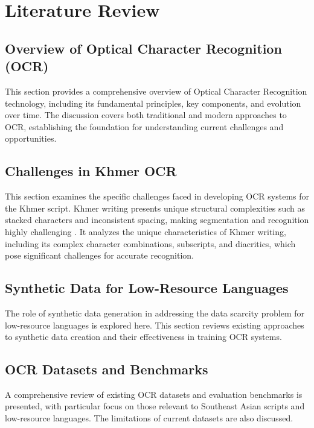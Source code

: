 \chapter{Literature Review}
\label{ch:literature}

\section{Overview of Optical Character Recognition (OCR)}
\label{sec:ocr-overview}
This section provides a comprehensive overview of Optical Character Recognition technology, including its fundamental principles, key components, and evolution over time. The discussion covers both traditional and modern approaches to OCR, establishing the foundation for understanding current challenges and opportunities.

\section{Challenges in Khmer OCR}
\label{sec:khmer-challenges}
This section examines the specific challenges faced in developing OCR systems for the Khmer script. Khmer writing presents unique structural complexities such as stacked characters and inconsistent spacing, making segmentation and recognition highly challenging \cite{muaz2015khmerocr}. It analyzes the unique characteristics of Khmer writing, including its complex character combinations, subscripts, and diacritics, which pose significant challenges for accurate recognition.

\section{Synthetic Data for Low-Resource Languages}
\label{sec:synthetic-data}
The role of synthetic data generation in addressing the data scarcity problem for low-resource languages is explored here. This section reviews existing approaches to synthetic data creation and their effectiveness in training OCR systems.

\section{OCR Datasets and Benchmarks}
\label{sec:datasets}
A comprehensive review of existing OCR datasets and evaluation benchmarks is presented, with particular focus on those relevant to Southeast Asian scripts and low-resource languages. The limitations of current datasets are also discussed.

